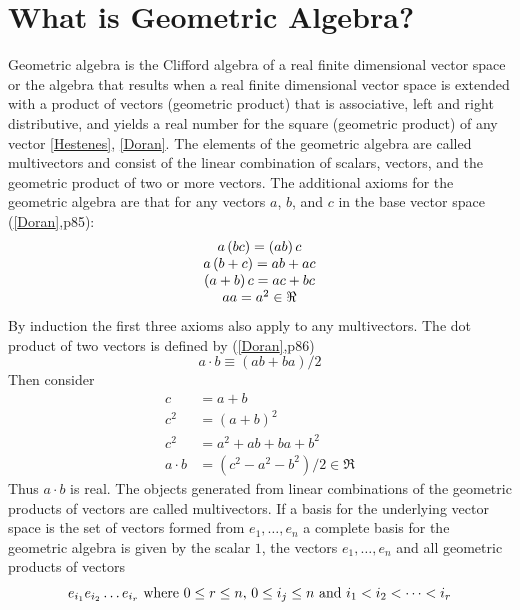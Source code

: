 \documentclass[letterpaper,10pt,english]{sphinxmanual}
\begin{document}
\chapter{What is Geometric Algebra?}
\label{GA:what-is-geometric-algebra}\label{GA:geometric-algebra-module-for-sympy}
Geometric algebra is the Clifford algebra of a real finite dimensional vector
space or the algebra that results when a real finite dimensional vector space
is extended with a product of vectors (geometric product) that is associative,
left and right distributive, and yields a real number for the square (geometric
product) of any vector {\hyperref[GA:hestenes]{{[}Hestenes{]}}}, {\hyperref[GA:doran]{{[}Doran{]}}}.  The elements of the geometric
algebra are called multivectors and consist of the linear combination of
scalars, vectors, and the geometric product of two or more vectors. The
additional axioms for the geometric algebra are that for any vectors $a$,
$b$, and $c$ in the base vector space ({\hyperref[GA:doran]{{[}Doran{]}}},p85):
\begin{equation*}
\begin{array}{c}
a\left ( bc \right ) = \left ( ab \right ) c \\
a\left ( b+c \right ) = ab+ac \\
\left ( a + b \right ) c = ac+bc \\
aa = a^{2} \in \Re
\end{array}
\end{equation*}
By induction the first three axioms also apply to any multivectors.  The dot product of
two vectors is defined by ({\hyperref[GA:doran]{{[}Doran{]}}},p86)
\begin{equation*}
   a\cdot b \equiv (ab+ba)/2
\end{equation*}
Then consider
\begin{align*}
   c &= a+b \\
   c^{2} &= (a+b)^{2} \\
   c^{2} &= a^{2}+ab+ba+b^{2} \\
   a\cdot b &= (c^{2}-a^{2}-b^{2})/2 \in \Re
\end{align*}
Thus $a\cdot b$  is real.  The objects generated from linear combinations
of the geometric products of vectors are called multivectors.  If a basis for
the underlying vector space is the set of vectors formed from $e_{1},\dots,e_{n}$
a complete basis for the geometric algebra is given by the scalar $1$, the vectors $e_{1},\dots,e_{n}$
and all geometric products of vectors
\begin{gather}
\begin{split}\begin{equation*}
   e_{i_{1}}e_{i_{2}}\dots e_{i_{r}} \mbox{ where } 0\le r \le n\mbox{, }0 \le i_{j} \le n \mbox{ and } i_{1}<i_{2}<\dots<i_{r}
\end{equation*}\end{split}\notag
\end{gather}
\end{document}
